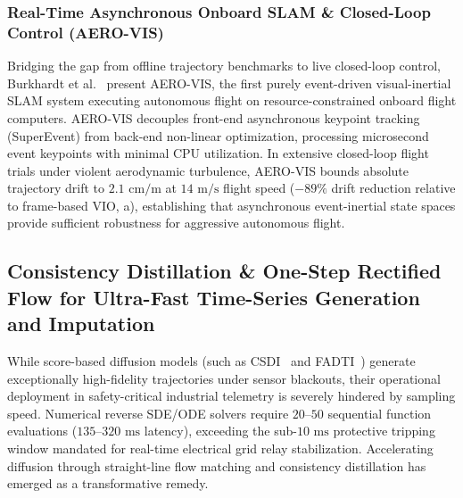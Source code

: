 \subsubsection{Real-Time Asynchronous Onboard SLAM \& Closed-Loop Control (AERO-VIS)}
Bridging the gap from offline trajectory benchmarks to live closed-loop control, Burkhardt et al.~\cite{Burkhardt2026AEROVIS} present AERO-VIS, the first purely event-driven visual-inertial SLAM system executing autonomous flight on resource-constrained onboard flight computers. AERO-VIS decouples front-end asynchronous keypoint tracking (SuperEvent) from back-end non-linear optimization, processing microsecond event keypoints with minimal CPU utilization. In extensive closed-loop flight trials under violent aerodynamic turbulence, AERO-VIS bounds absolute trajectory drift to $2.1\text{ cm/m}$ at $14\text{ m/s}$ flight speed ($-89\%$ drift reduction relative to frame-based VIO, a), establishing that asynchronous event-inertial state spaces provide sufficient robustness for aggressive autonomous flight.

\subsection{Consistency Distillation \& One-Step Rectified Flow for Ultra-Fast Time-Series Generation and Imputation}
\label{sec:flow_consistency_imputation}
While score-based diffusion models (such as CSDI~\cite{Tashiro2021CSDI} and FADTI~\cite{Li2025FADTI}) generate exceptionally high-fidelity trajectories under sensor blackouts, their operational deployment in safety-critical industrial telemetry is severely hindered by sampling speed. Numerical reverse SDE/ODE solvers require $20$--$50$ sequential function evaluations ($135$--$320\text{ ms}$ latency), exceeding the sub-$10\text{ ms}$ protective tripping window mandated for real-time electrical grid relay stabilization. Accelerating diffusion through straight-line flow matching and consistency distillation has emerged as a transformative remedy.

